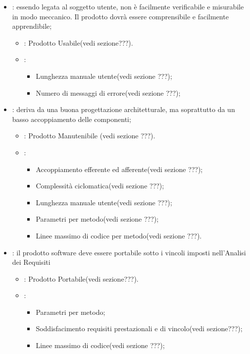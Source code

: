 \begin{itemize}
\begin{itemize}
\item {}: 
\item {}:
\end{itemize}
\item {}: essendo legata al soggetto utente, non è facilmente verificabile e misurabile in modo meccanico. Il prodotto dovrà essere comprensibile e facilmente apprendibile;
\begin{itemize}
\item {}: Prodotto Usabile(vedi sezione???).
\item {}:
\begin{itemize}
\item Lunghezza manuale utente(vedi sezione ???);
\item Numero di messaggi di errore(vedi sezione ???);
\end{itemize} 
\end{itemize}
\item {}: deriva da una buona progettazione architetturale, ma soprattutto da un basso accoppiamento delle componenti;
\begin{itemize}
\item {}: Prodotto Manutenibile (vedi sezione ???).
\item {}:
\begin{itemize}
\item Accoppiamento efferente ed afferente(vedi sezione ???);
\item Complessità ciclomatica(vedi sezione ???);
\item Lunghezza manuale utente(vedi sezione ???);
\item Parametri per metodo(vedi sezione ???);
\item Linee massimo di codice per metodo(vedi sezione ???).
\end{itemize}
\end{itemize}
\item {}: il prodotto software deve essere portabile sotto i vincoli imposti nell'Analisi dei Requisiti
\begin{itemize}
\item {}: Prodotto Portabile(vedi sezione???).
\item {}:
\begin{itemize}
\item Parametri per metodo;
\item Soddisfacimento requisiti prestazionali e di vincolo(vedi sezione???);
\item Linee massimo di codice(vedi sezione ???);
\end{itemize}
\end{itemize}
\end{itemize} 

